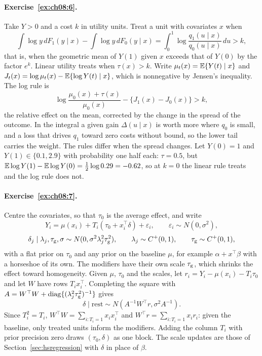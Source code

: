\paragraph{Exercise~\ref{ex:ch08:6}.} Take $Y > 0$ and a cost $k$ in utility units. Treat a unit with covariates $x$ when
\[
\int \log y\,dF_1(y \mid x) - \int \log y\,dF_0(y \mid x) = \int_0^1 \log\frac{q_1(u \mid x)}{q_0(u \mid x)}\,du > k,
\]
that is, when the geometric mean of $Y(1)$ given $x$ exceeds that of $Y(0)$ by the factor $e^k$. Linear utility treats when $\tau(x) > k$. Write $\mu_t(x) = \mathbb{E}\{Y(t) \mid x\}$ and $J_t(x) = \log\mu_t(x) - \mathbb{E}\{\log Y(t) \mid x\}$, which is nonnegative by Jensen's inequality. The log rule is
\[
\log\frac{\mu_0(x) + \tau(x)}{\mu_0(x)} - \{J_1(x) - J_0(x)\} > k,
\]
the relative effect on the mean, corrected by the change in the spread of the outcome. In the integral a given gain $\Delta(u \mid x)$ is worth more where $q_0$ is small, and a loss that drives $q_1$ toward zero costs without bound, so the lower tail carries the weight. The rules differ when the spread changes. Let $Y(0) = 1$ and $Y(1) \in \{0.1, 2.9\}$ with probability one half each: $\tau = 0.5$, but $\mathbb{E}\log Y(1) - \mathbb{E}\log Y(0) = \tfrac12\log 0.29 = -0.62$, so at $k = 0$ the linear rule treats and the log rule does not. 

\paragraph{Exercise~\ref{ex:ch08:7}.} Centre the covariates, so that $\tau_0$ is the average effect, and write
\[
Y_i = \mu(x_i) + T_i(\tau_0 + x_i^\top\delta) + \varepsilon_i, \qquad \varepsilon_i \sim N(0, \sigma^2),
\]
\[
\delta_j \mid \lambda_j, \tau_{\mathrm{g}}, \sigma \sim N(0, \sigma^2\lambda_j^2\tau_{\mathrm{g}}^2), \qquad \lambda_j \sim C^+(0, 1), \qquad \tau_{\mathrm{g}} \sim C^+(0, 1),
\]
with a flat prior on $\tau_0$ and any prior on the baseline $\mu$, for example $\alpha + x^\top\beta$ with a horseshoe of its own. The modifiers have their own scale $\tau_{\mathrm{g}}$, which shrinks the effect toward homogeneity. Given $\mu$, $\tau_0$ and the scales, let $r_i = Y_i - \mu(x_i) - T_i\tau_0$ and let $W$ have rows $T_i x_i^\top$. Completing the square with $A = W^\top W + \mathrm{diag}\{(\lambda_j^2\tau_{\mathrm{g}}^2)^{-1}\}$ gives
\[
\delta \mid \text{rest} \sim N(A^{-1}W^\top r, \sigma^2A^{-1}).
\]
Since $T_i^2 = T_i$, $W^\top W = \sum_{i:T_i = 1}x_i x_i^\top$ and $W^\top r = \sum_{i:T_i = 1}x_i r_i$: given the baseline, only treated units inform the modifiers. Adding the column $T_i$ with prior precision zero draws $(\tau_0, \delta)$ as one block. The scale updates are those of Section~\ref{sec:hsregression} with $\delta$ in place of $\beta$.

